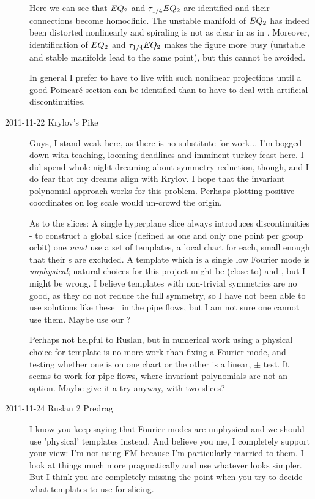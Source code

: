 \begin{description}
Here we can see that $EQ_{2}$ and $\tau_{1/4} EQ_{2}$ are identified and their
connections become homoclinic. The unstable manifold of $EQ_{2}$ has indeed been distorted
nonlinearly and spiraling is not as clear in  as in
. Moreover, identification of $EQ_{2}$ and $\tau_{1/4} EQ_{2}$
makes the figure more busy (unstable and stable manifolds lead to the same point), but this
cannot be avoided.

In general I prefer to have to live with such nonlinear projections until
a good Poincar\'e section can be identified than to have to deal with
artificial discontinuities.

\item[2011-11-22 Krylov's Pike] Guys, I stand weak here, as
there is no substitute for work... I'm bogged down with teaching, looming
deadlines and imminent turkey feast here. I did spend whole night
dreaming about symmetry reduction, though, and I do fear that my dreams
align with Krylov. I hope that the invariant polynomial approach works
for this problem. Perhaps plotting positive coordinates on log scale
would un-crowd the origin.

As to the slices: A single hyperplane slice always
introduces discontinuities - to construct a global slice (defined as one
and only one point per group orbit) one \emph{must} use a set of
templates, a local chart for each, small enough that their \sset s are
excluded. A template which is a single low Fourier mode is
\emph{unphysical}; natural choices for this project might be (close to)
 and , but I might be wrong. I believe templates with
non-trivial symmetries are no good, as they do not reduce the full
symmetry, so I have not been able to use solutions like these \eqva\ in
the pipe flows, but I am not sure one cannot use them. Maybe use our
?

Perhaps not helpful to Ruslan, but in numerical work using a physical
choice for template is no more work than fixing a Fourier mode, and
testing whether one is on one chart or the other is a linear, $\pm$ test.
It seems to work for pipe flows, where invariant polynomials are not an
option. Maybe give it a try anyway, with two slices?

\item[2011-11-24 Ruslan 2 Predrag] I know you keep saying that Fourier modes are unphysical and we should use 'physical' templates instead.  And believe you me, I completely support your view: I'm not using FM because I'm particularly married to them.  I look at things much more pragmatically and use whatever looks simpler.  But I think you are completely missing the point when you try to decide what templates to use for slicing.


\end{description}
